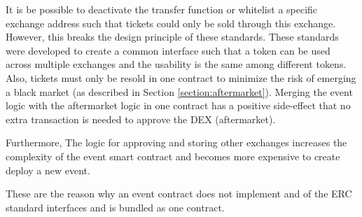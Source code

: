 It is be possible to deactivate the transfer function or whitelist a specific exchange address such that tickets could only be sold through this exchange. However, this breaks the design principle of these standards. These standards were developed to create a common interface such that a token can be used across multiple exchanges and the usability is the same among different tokens. Also, tickets must only be resold in one contract to minimize the risk of emerging a black market (as described in Section \ref{section:aftermarket}). Merging the event logic with the aftermarket logic in one contract has a positive side-effect that no extra transaction is needed to approve the DEX (aftermarket). 

Furthermore, The logic for approving and storing other exchanges increases the complexity of the event smart contract and becomes more expensive to create deploy a new event.

These are the reason why an event contract does not implement and of the ERC standard interfaces and is bundled as one contract. 